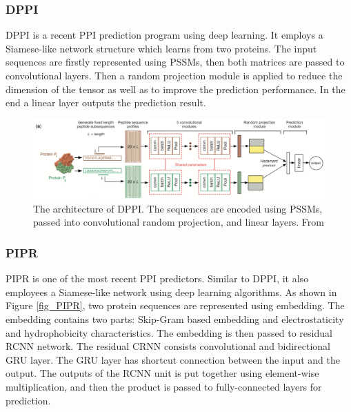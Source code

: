 \subsubsection{DPPI}
DPPI \cite{hashemifar2018predicting} is a recent PPI prediction program using deep learning. It employs a Siamese-like network structure which learns from two proteins. The input sequences are firstly represented using PSSMs, then both matrices are passed to convolutional layers. Then a random projection module is applied to reduce the dimension of the tensor as well as to improve the prediction performance. In the end a linear layer outputs the prediction result.
\begin{figure}[h!]
\begin{center}
\includegraphics[height =6 cm, width = 17cm]{img/DPPI.png}
\caption[The architecture of DPPI]{The architecture of DPPI. The sequences are encoded using PSSMs, passed into convolutional random projection, and linear layers. From \cite{hashemifar2018predicting} \label{fig_DPPI}}
\end{center}
\end{figure} 
\subsubsection{PIPR}
PIPR \cite{chen2019multifaceted} is one of the most recent PPI predictors. Similar to DPPI, it also employees a Siamese-like network using deep learning algorithms. As shown in Figure \ref{fig_PIPR}, two protein sequences are represented using embedding. The embedding contains two parts: Skip-Gram \cite{mikolov2013distributed} based embedding and electrostaticity and hydrophobicity characteristics. The embedding is then passed to residual RCNN network. The residual CRNN consists convolutional and bidirectional GRU layer. The GRU layer has shortcut connection between the input and the output. The outputs of the RCNN unit is put together using element-wise multiplication, and then the product is passed to fully-connected layers for prediction. 

